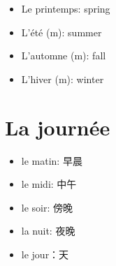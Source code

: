 \begin{itemize}
\item Le printemps: spring
\item L’été (m): summer
\item L’automne (m): fall
\item L’hiver (m): winter
\end{itemize}

\section{La journée}
\begin{itemize}
\item le matin: 早晨
\item le midi: 中午
\item le soir: 傍晚
\item la nuit: 夜晚
\item le jour：天

\end{itemize}

